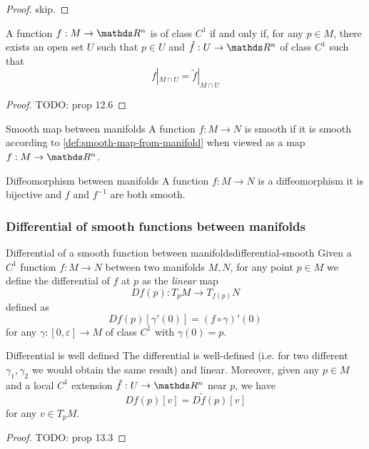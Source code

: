 \documentclass[12pt]{extarticle}
\begin{document}
\begin{proof}
	skip.
\end{proof}

\begin{proposition}{}{}
	A function $f: M \to \R^n$ is of class $C^1$ if and only if, for any $p \in M$, there exists an
	open set $U$ such that $p \in U$ and $\tilde f: U \to \R^n$ of class $C^1$ such that
	\begin{equation}
		f |_{M \cap U} = \tilde f |_{M \cap U}
	\end{equation}
\end{proposition}

\begin{proof}
	TODO: prop 12.6
\end{proof}

\begin{definition}{Smooth map between manifolds}{}
	A function $f: M \to N$ is smooth if it is smooth according to \cref{def:smooth-map-from-manifold}
	when viewed as a map $f: M \to \R^n$.
\end{definition}

\begin{definition}{Diffeomorphism between manifolds}{}
	A function $f: M \to N$ is a diffeomorphism it is bijective and $f$ and $f^{-1}$ are both smooth.
\end{definition}

\subsubsection{Differential of smooth functions between manifolds}

\begin{definition}{Differential of a smooth function between manifolds}{differential-smooth}
	Given a $C^1$ function $f: M \to N$ between two manifolds $M, N$, for any point $p \in M$ we
	define the differential of $f$ at $p$ as the \emph{linear} map
	\begin{equation}
		Df(p): T_p M \to T_{f(p)} N
	\end{equation}
	defined as
	\begin{equation}
		Df(p)[\gamma'(0)] = (f \circ \gamma)' (0)
	\end{equation}
	for any $\gamma: [0, \varepsilon] \to M$ of class $C^1$ with $\gamma(0) = p$.
\end{definition}

\begin{proposition}{Differential is well defined}{}
	The differential is well-defined (i.e. for two different $\gamma_1, \gamma_2$ we would obtain the
	same result) and linear.
	Moreover, given any $p \in M$ and a local $C^1$ extension $\tilde f: U \to \R^n$ near $p$, we have
	\begin{equation}
		Df(p)[v] = D\tilde f (p)[v]
	\end{equation}
	for any $v \in T_p M$.
\end{proposition}
\begin{proof}
	TODO: prop 13.3
\end{proof}
\end{document}
